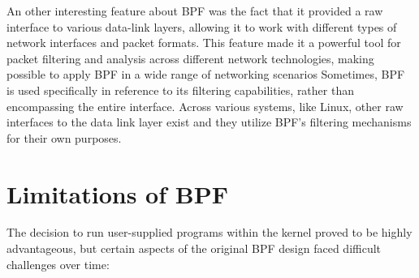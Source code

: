 An other interesting feature about BPF was the fact that it provided a raw interface to various data-link layers, allowing it to work with different types of network interfaces and packet formats.
This feature made it a powerful tool for packet filtering and analysis across different network technologies, making possible to apply BPF in a wide range of networking scenarios
Sometimes, BPF is used specifically in reference to its filtering capabilities, rather than encompassing the entire interface. 
Across various systems, like Linux, other raw interfaces to the data link layer exist and they utilize BPF's filtering mechanisms for their own purposes. 

\section{Limitations of BPF}

The decision to run user-supplied programs within the kernel proved to be highly advantageous, but certain aspects of the original BPF design faced difficult challenges over time:


